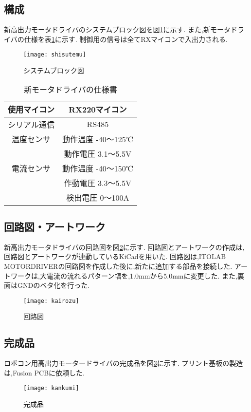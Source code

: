 \documentclass[twocolumn,11pt]{abst}
\begin{document}
\subsection{構成}
新高出力モータドライバのシステムブロック図を図\ref{fig:shisutemu}に示す.
また,新モータドライバの仕様を表\ref{tab:shinshiyou}に示す.
制御用の信号は全てRXマイコンで入出力される.
\begin{figure}[H]
  \begin{center}
    \texttt{[image: shisutemu]}
    \end{center}
  \caption{システムブロック図}
 \label{fig:shisutemu}
\end{figure}
\begin{table}[htb]
\centering
\caption{新モータドライバの仕様書}
\begin{tabular}{|c|c|} \hline
使用マイコン&RX220マイコン\\ \hline
シリアル通信&RS485\\ \hline
温度センサ&動作温度 -40～125℃ \\
&動作電圧 3.1～5.5V \\ \hline
電流センサ&動作温度 -40～150℃\\
&作動電圧 3.3～5.5V \\
&検出電圧 0～100A \\ \hline
\end{tabular}
\label{tab:shinshiyou}
\end{table}

\subsection{回路図・アートワーク}
新高出力モータドライバの回路図を図\ref{fig:kairozu}に示す.
回路図とアートワークの作成は,回路図とアートワークが連動しているKiCadを用いた.
回路図は,ITOLAB MOTORDRIVERの回路図を作成した後に,新たに追加する部品を接続した.
アートワークは,大電流の流れるパターン幅を,1.0mmから5.0mmに変更した.
また,裏面はGNDのベタ化を行った.
\begin{figure}[H]
\begin{center}
\texttt{[image: kairozu]}
\end{center}
\caption{回路図}
\label{fig:kairozu}
\end{figure}

\subsection{完成品}
ロボコン用高出力モータードライバの完成品を図\ref{fig:kankumi}に示す.
プリント基板の製造は,Fusion PCBに依頼した.
\begin{figure}[H]
\begin{center}
\texttt{[image: kankumi]}
\end{center}
\caption{完成品}
\label{fig:kankumi}
\end{figure}
\end{document}
